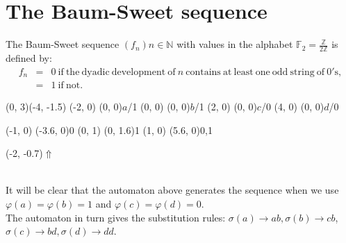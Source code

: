 \documentclass{article}
\begin{document}
\section*{The Baum-Sweet sequence}
The Baum-Sweet sequence $(f_n)n \in \mathbb{N}$ with values in the alphabet
$\mathbb{F}_2 = \frac{\mathbb{Z}}{2 \mathbb{Z}}$ is defined by:
\begin{eqnarray*}
f_n &=& 0 \mathrm{\ if\ the\ dyadic\ development\ of\ } n
          \mathrm{\ contains\ at\ least\ one\ odd\ string\ of\ 0's},\\
    &=& 1 \mathrm{\ if\ not.}
\end{eqnarray*}
\begin{graph}(0, 3)(-4, -1.5)
  (-2, 0) (0, 0){$a$/1}
  (0, 0)  (0, 0){$b$/1}
  (2, 0)  (0, 0){$c$/0}
  (4, 0)  (0, 0){$d$/0}

  (-1, 0) \freetext(-3.6, 0){0}
   
   
  (0, 1) \freetext(0, 1.6){1}
   
   
  (1, 0) \freetext(5.6, 0){0,1}

  \freetext(-2, -0.7){$\Uparrow$}
\end{graph}\\
It will be clear that the automaton above generates the sequence when we use
$\varphi(a) = \varphi(b) = 1$ and $\varphi(c) = \varphi(d) = 0$.\\
The automaton in turn gives the substitution rules:
$\sigma(a) \rightarrow ab, \sigma(b) \rightarrow cb$,
$\sigma(c) \rightarrow bd, \sigma(d) \rightarrow dd$.
\end{document}
